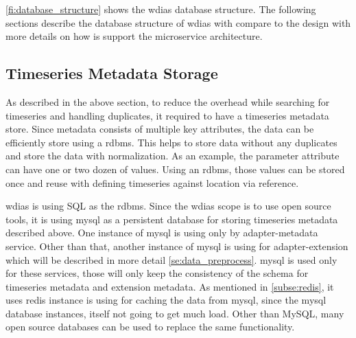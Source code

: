 
\cref{fi:database_structure} shows the \acrshort{wdias} database structure.
The following sections describe the database structure of \acrshort{wdias} with compare to the design with more details on how is support the microservice architecture.

\subsection{Timeseries Metadata Storage}
\label{subse:mysql}

As described in the above section, to reduce the overhead while searching for timeseries and handling duplicates, it required to have a timeseries metadata store. Since metadata consists of multiple key attributes, the data can be efficiently store using a \acrfull{rdbms}. This helps to store data without any duplicates and store the data with normalization. As an example, the parameter attribute can have one or two dozen of values. Using an \acrshort{rdbms}, those values can be stored once and reuse with defining timeseries against location via reference.

\acrshort{wdias} is using SQL as the \acrfull{rdbms}. 
Since the \acrshort{wdias} scope is to use open source tools, it is using \acrshort{mysql} as a persistent database for storing timeseries metadata described above.
One instance of \acrshort{mysql} is using only by adapter-metadata service.
Other than that, another instance of \acrshort{mysql} is using for adapter-extension which will be described in more detail \cref{se:data_preprocess}.
\acrshort{mysql} is used only for these services, those will only keep the consistency of the schema for timeseries metadata and extension metadata.
As mentioned in \cref{subse:redis}, it uses \acrshort{redis} instance is using for caching the data from \acrshort{mysql}, since the \acrshort{mysql} database instances, itself not going to get much load.
Other than MySQL, many open source databases can be used to replace the same functionality.

